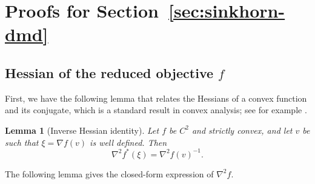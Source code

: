 \documentclass{article}
\theoremstyle{plain}
\newtheorem{lemma}{Lemma}
\theoremstyle{remark}
\begin{document}




\appendix
\section{Proofs for Section~\ref{sec:sinkhorn-dmd}}
\label{app:proof-Sinkhorn}
\subsection{Hessian of the reduced objective \texorpdfstring{$f$}{f}}
First, we have the following lemma that relates the Hessians of a convex function and its conjugate, which is a standard result in convex analysis; see for example \cite{rockafellar1997convex}.
\begin{lemma}[Inverse Hessian identity]
Let $f$ be $C^2$ and strictly convex, and let $v$ be such that $\xi=\nabla f(v)$ is well defined. Then
$$
\nabla^2 f^*(\xi)=\nabla^2 f(v)^{-1}.
$$
\end{lemma}

The following lemma gives the closed-form expression of $\nabla^2 f$.
\end{document}
